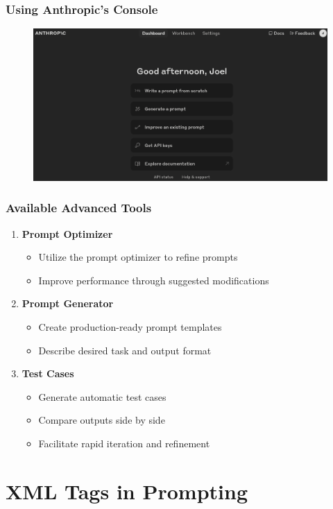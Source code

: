 \documentclass{beamer}
\begin{document}
\begin{frame}
\frametitle{Using Anthropic's Console}
\begin{figure}
    \centering
    \includegraphics[width=1\linewidth]{cs12-prompt-anthropic_console.png}
\end{figure}
\end{frame}

\begin{frame}
\frametitle{Available Advanced Tools}
\begin{enumerate}
\item \textbf{Prompt Optimizer}
\begin{itemize}
\item Utilize the prompt optimizer to refine prompts
\item Improve performance through suggested modifications
\end{itemize}

\item \textbf{Prompt Generator}
\begin{itemize}
\item Create production-ready prompt templates
\item Describe desired task and output format
\end{itemize}

\item \textbf{Test Cases}
\begin{itemize}
\item Generate automatic test cases
\item Compare outputs side by side
\item Facilitate rapid iteration and refinement
\end{itemize}
\end{enumerate}
\end{frame}
\section{XML Tags in Prompting}
\frame{\sectionpage}
\end{document}
